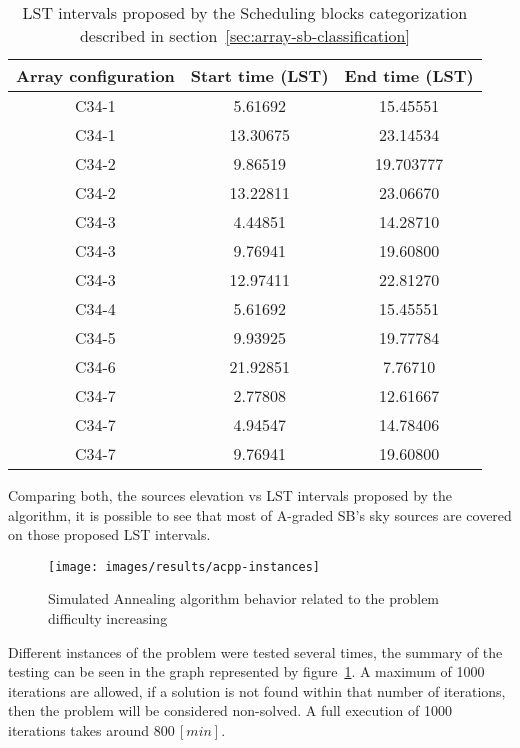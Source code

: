 \begin{table}[htbp]
\begin{center}
\begin{tabular}{|c|c|c|}
\hline
Array configuration & Start time (LST) & End time (LST) \\ \hline
C34-1 & 5.61692 & 15.45551 \\ \hline
C34-1 & 13.30675 & 23.14534 \\ \hline
C34-2 & 9.86519 & 19.703777 \\ \hline
C34-2 & 13.22811 & 23.06670 \\ \hline
C34-3 & 4.44851 & 14.28710 \\ \hline
C34-3 & 9.76941 & 19.60800 \\ \hline
C34-3 & 12.97411 & 22.81270 \\ \hline
C34-4 & 5.61692 & 15.45551 \\ \hline
C34-5 & 9.93925 & 19.77784 \\ \hline
C34-6 & 21.92851 & 7.76710 \\ \hline
C34-7 & 2.77808 & 12.61667 \\ \hline
C34-7 & 4.94547 & 14.78406 \\ \hline
C34-7 & 9.76941 & 19.60800 \\ \hline
\end{tabular}
\end{center}
\caption[LST intervals proposed by the Scheduling Blocks categorization]
{LST intervals proposed by the Scheduling blocks categorization described in section~\ref{sec:array-sb-classification}}
\label{table:lst-int-prop}
\end{table}

Comparing both, the sources elevation vs LST intervals proposed by the algorithm, it is possible to see that most of A-graded SB's sky sources are covered on those proposed LST intervals.

\begin{figure}[htbp]
\begin{center}
\texttt{[image: images/results/acpp-instances]}
\end{center}
\caption{Simulated Annealing algorithm behavior related to the problem difficulty increasing}
\label{fig:acpp-behavior}
\end{figure}

Different instances of the problem were tested several times, the summary of the testing can be seen in the graph represented by figure~\ref{fig:acpp-behavior}. A maximum of 1000 iterations are allowed, if a solution is not found within that number of iterations, then the problem will be considered non-solved. A full execution of 1000 iterations takes around $800\,[min]$.


